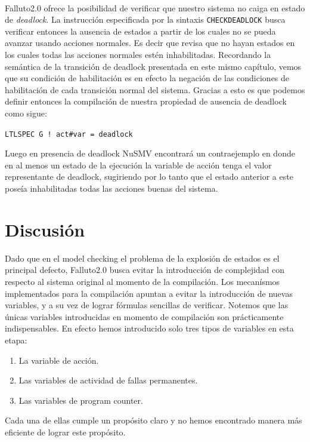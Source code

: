 \documentclass[pdftex,a4paper,12pt]{book}
\begin{document}
~\\

Falluto2.0 ofrece la posibilidad de verificar que nuestro sistema no caiga en estado de \textit{deadlock}. La instrucci\'on especificada por la sintaxis \texttt{CHECKDEADLOCK} busca verificar entonces la ausencia de estados a partir de los cuales no se pueda avanzar usando acciones normales. Es decir que revisa que no hayan estados en los cuales todas las acciones normales est\'en inhabilitadas. Recordando la sem\'antica de la transici\'on de deadlock presentada en este mismo cap\'itulo, vemos que su condici\'on de habilitaci\'on es en efecto la negaci\'on de las condiciones de habilitaci\'on de cada transici\'on normal del sistema. Gracias a esto es que podemos definir entonces la compilaci\'on de nuestra propiedad de ausencia de deadlock como sigue:
\begin{center}
\texttt{LTLSPEC~G~!~act\#var = deadlock}
\end{center}
Luego en presencia de deadlock NuSMV encontrar\'a un contraejemplo en donde en al menos un estado de la ejecuci\'on la variable de acci\'on tenga el valor representante de deadlock, sugiriendo por lo tanto que el estado anterior a este pose\'ia inhabilitadas todas las acciones buenas del sistema.

\section{Discusi\'on}

Dado que en el model checking el problema de la explosi\'on de estados es el principal defecto, Falluto2.0 busca evitar la introducci\'on de complejidad con respecto al sistema original al momento de la compilaci\'on. Los mecan\'ismos implementados para la compilaci\'on apuntan a evitar la introducci\'on de nuevas variables, y a su vez de lograr f\'ormulas sencillas de verificar. Notemos que las \'unicas variables introducidas en momento de compilaci\'on son pr\'acticamente indispensables. En efecto hemos introducido solo tres tipos de variables en esta etapa: 
\begin{enumerate}
\item La variable de acci\'on.
\item Las variables de actividad de fallas permanentes.
\item Las variables de program counter.
\end{enumerate}
Cada una de ellas cumple un prop\'osito claro y no hemos encontrado manera m\'as eficiente de lograr este prop\'osito.
\end{document}
